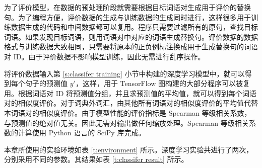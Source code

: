 为了评价模型，在数据的预处理阶段就需要根据目标词语对生成用于评价的替换句。为了编程方便，评价数据的生成与训练数据的生成同时进行，这样很多用于训练数据生成的代码和中间数据都可以复用。程序只需要过滤所有的原句，查找目标词语。如果发现目标词语，则用词语对中对应的词语生成替换句。评价数据的数据格式与训练数据大致相同，只需要将原本的正负例标注换成用于生成替换句的词语对 ID。由于评价数据不影响模型训练，因此无需进行乱序操作。

将评价数据输入第 \ref{s:classifer training} 小节中构建的深度学习模型中，就可以得到每个句子的预测值 $y'$，这样，用于 TensorFlow 图构建的大部分程序可以被复用。根据词语对 ID 将预测值分组，并且求预测值的平均值，就可以得到每个词语对的相似度评价。对于词典外词汇，由其他所有词语对的相似度评价的平均值代替本词语对的相似度评价。由于模型性能的评价指标是 Spearman 等级相关系数，与预测值的绝对值无关。因此无需对输出做任何缩放处理。Spearman 等级相关系数的计算使用 Python 语言的 SciPy 库完成。

本章所使用的实验环境如表 \ref{t:environment} 所示。深度学习实验共进行了两次，分别采用不同的参数。其结果如表 \ref{t:classifer result} 所示。
\begin{table}[h]
	\caption{环境配置}
	\label{t:environment}
	\vspace{0.5em}\centering\wuhao
\end{table}


